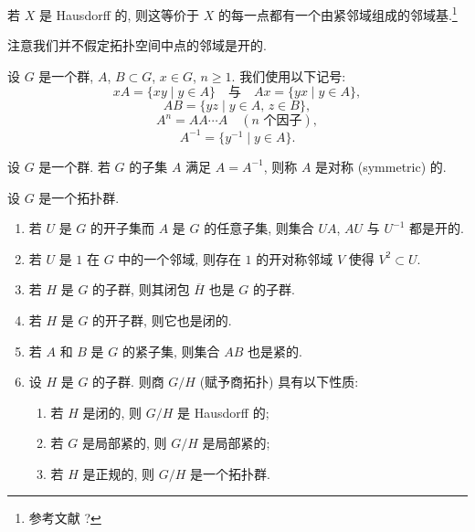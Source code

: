\begin{remark}[局部紧与紧邻域基]
\label{rem:I.1.4}
若 $X$ 是 Hausdorff 的, 则这等价于 $X$ 的每一点都有一个由紧邻域组成的邻域基.\footnote{参考文献 ?}

注意我们并不假定拓扑空间中点的邻域是开的.
\end{remark}

\begin{notation}[子集的运算]
\label{not:I.1.5}
设 $G$ 是一个群, $A$, $B \subset G$, $x \in G$, $n \geq 1$. 我们使用以下记号:
\[
xA = \{xy \mid y \in A\} \quad \text{与} \quad Ax = \{yx \mid y \in A\},
\]
\[
AB = \{yz \mid y \in A,\, z \in B\},
\]
\[
A^n = AA \cdots A \quad (\text{$n$ 个因子}),
\]
\[
A^{-1} = \{y^{-1} \mid y \in A\}.
\]
\end{notation}

\begin{definition}
\label{def:I.1.6}
设 $G$ 是一个群. 若 $G$ 的子集 $A$ 满足 $A = A^{-1}$, 则称 $A$ 是对称 (symmetric) 的.
\end{definition}

\begin{proposition}[拓扑群的基本性质]
\label{prop:I.1.7}
设 $G$ 是一个拓扑群.
\begin{enumerate}
\item[(1)] 若 $U$ 是 $G$ 的开子集而 $A$ 是 $G$ 的任意子集, 则集合 $UA$, $AU$ 与 $U^{-1}$ 都是开的.
\item[(2)] 若 $U$ 是 $1$ 在 $G$ 中的一个邻域, 则存在 $1$ 的开对称邻域 $V$ 使得 $V^2 \subset U$.
\item[(3)] 若 $H$ 是 $G$ 的子群, 则其闭包 $\overline{H}$ 也是 $G$ 的子群.
\item[(4)] 若 $H$ 是 $G$ 的开子群, 则它也是闭的.
\item[(5)] 若 $A$ 和 $B$ 是 $G$ 的紧子集, 则集合 $AB$ 也是紧的.
\item[(6)] 设 $H$ 是 $G$ 的子群. 则商 $G/H$ (赋予商拓扑) 具有以下性质:
  \begin{enumerate}
  \item[(a)] 若 $H$ 是闭的, 则 $G/H$ 是 Hausdorff 的;
  \item[(b)] 若 $G$ 是局部紧的, 则 $G/H$ 是局部紧的;
  \item[(c)] 若 $H$ 是正规的, 则 $G/H$ 是一个拓扑群.
  \end{enumerate}
\end{enumerate}
\end{proposition}

